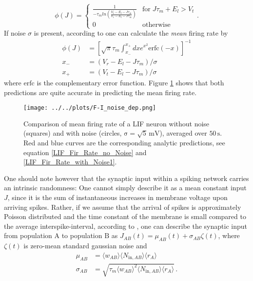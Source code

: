 \documentclass[10pt,a4paper]{article}
\begin{document}
\begin{equation}
\phi(J) = \begin{cases}\frac{1}{-\tau_m ln \left( \frac{V_t -E_l-J\tau_m}{V_r -E_l-J\tau_m} \right)} & \mathrm{for}\; J\tau_m + E_l > V_t\\
0 & \mathrm{otherwise}
\end{cases}.
\label{LIF_Fir_Rate_no_Noise}
\end{equation}
If noise $\sigma$ is present, according to \cite{Roxin_Firing_Rate_Distribution} one can calculate the \emph{mean} firing rate by
\begin{align}
\phi(J) &= \left[ \sqrt{\pi}\tau_m \int_{x_-}^{x_+} dx e^{x^2} \mathrm{erfc}(-x) \right]^{-1} \label{LIF_Fir_Rate_with_Noise1}\\
x_- &= \left( V_r-E_l-J\tau_m \right)/\sigma \label{LIF_Fir_Rate_with_Noise2}\\
x_+ &= \left( V_t-E_l-J\tau_m \right)/\sigma \label{LIF_Fir_Rate_with_Noise3}
\end{align}
where $\mathrm{erfc}$ is the complementary error function. Figure \ref{F-I_noise_dep} shows that both predictions are quite accurate in predicting the mean firing rate. 
\begin{figure}
\begin{center}
\texttt{[image: ../../plots/F-I\_noise\_dep.png]}
\end{center}
\caption{Comparison of mean firing rate of a LIF neuron without noise (squares) and with noise (circles, $\mathrm{\sigma = \sqrt{5}\, mV}$), averaged over $\mathrm{50\, s}$. Red and blue curves are the corresponding analytic predictions, see equation \ref{LIF_Fir_Rate_no_Noise} and \ref{LIF_Fir_Rate_with_Noise1}.}
\label{F-I_noise_dep}
\end{figure}
One should note however that the synaptic input within a spiking network carries an intrinsic randomness: One cannot simply describe it as a mean constant input $J$, since it is the sum of instantaneous increases in membrane voltage upon arriving spikes. Rather, if we assume that the arrival of spikes is approximately Poisson distributed and the time constant of the membrane is small compared to the average interspike-interval, according to \cite{Roxin_Firing_Rate_Distribution}, one can describe the synaptic input from population $\mathrm{A}$ to population $\mathrm{B}$ as $J_{AB}(t) = \mu_{AB} (t) + \sigma_{AB} \zeta(t)$, where $\zeta(t)$ is zero-mean standard gaussian noise and
\begin{align}
\mu_{AB} &= \langle w_{AB} \rangle  \langle N_{\mathrm{in},AB} \rangle \langle r_A \rangle \label{Noise_Approx_1}\\
\sigma_{AB} &= \sqrt{\tau_m  \langle w_{AB} \rangle ^2  \langle N_{\mathrm{in},AB} \rangle  \langle r_A \rangle} \label{Noise_Approx_2} \, .
\end{align}
\end{document}
